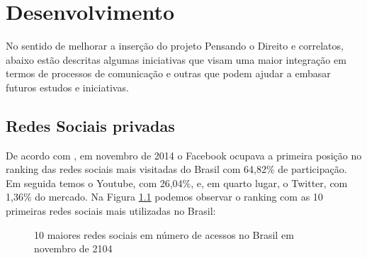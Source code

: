 \chapter{Desenvolvimento}
No sentido de melhorar a inserção do projeto Pensando o Direito e correlatos, 
abaixo estão descritas algumas iniciativas que visam uma maior integração em
termos de processos de comunicação e outras que podem ajudar a embasar futuros
estudos e iniciativas.

\section{Redes Sociais privadas}
De acordo com , em novembro de 2014 o Facebook ocupava a primeira posição no ranking das redes sociais mais visitadas do Brasil com 64,82\% de participação. Em seguida temos o Youtube, com 26,04\%, e, em quarto lugar, o Twitter, com 1,36\% do mercado. Na Figura \ref{fig:social-network-share-br} podemos observar o ranking com as 10 primeiras redes sociais mais utilizadas no Brasil:
\begin{figure}[htb]%
	\begin{center}
	\end{center}%
	\caption{10 maiores redes sociais em número de acessos no Brasil em novembro de 2104\label{fig:social-network-share-br}}%
\end{figure}%

